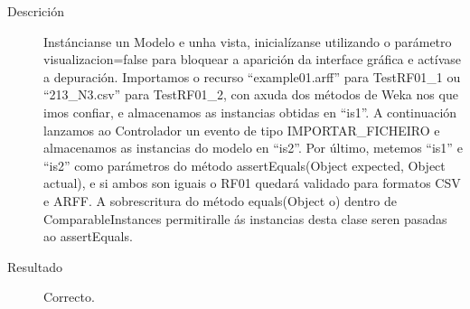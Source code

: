 \begin{description}
\begin{lstlisting}
\end{lstlisting}
\item[Descrición]
Instáncianse un Modelo e unha vista, inicialízanse utilizando o parámetro visualizacion=false para bloquear a aparición da interface gráfica e actívase a depuración. Importamos o recurso ``example01.arff'' para TestRF01\_1 ou ``213\_N3.csv'' para TestRF01\_2, con axuda dos métodos de Weka nos que imos confiar, e almacenamos as instancias obtidas en ``is1''. A continuación lanzamos ao Controlador un evento de tipo IMPORTAR\_FICHEIRO e almacenamos as instancias do modelo en ``is2''. Por último, metemos ``is1'' e ``is2'' como parámetros do método assertEquals(Object expected, Object actual), e si ambos son iguais o RF01 quedará validado para formatos CSV e ARFF. A sobrescritura do método equals(Object o) dentro de ComparableInstances permitiralle ás instancias desta clase seren pasadas ao assertEquals.
\item[Resultado]
Correcto.
\end{description}

